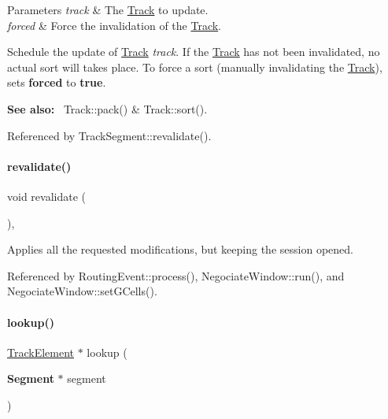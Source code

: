 \begin{DoxyParams}{Parameters}
{\em track} & The \mbox{\hyperlink{classKite_1_1Track}{Track}} to update. \\
\hline
{\em forced} & Force the invalidation of the {\ttfamily \mbox{\hyperlink{classKite_1_1Track}{Track}}}.\\
\hline
\end{DoxyParams}
Schedule the update of \mbox{\hyperlink{classKite_1_1Track}{Track}} {\itshape track}. If the {\ttfamily \mbox{\hyperlink{classKite_1_1Track}{Track}}} has not been invalidated, no actual sort will takes place. To force a sort (manually invalidating the {\ttfamily \mbox{\hyperlink{classKite_1_1Track}{Track}}}), sets {\bfseries forced} to {\bfseries true}.

{\bfseries See also\+:}~ Track\+::pack() \& Track\+::sort(). 

Referenced by Track\+Segment\+::revalidate().

\mbox{\label{classKite_1_1Session_a5bd93abe1416952ace15a98dbeeed124}} 
\paragraph{\texorpdfstring{revalidate()}{revalidate()}}
{\footnotesize\ttfamily void revalidate (\begin{DoxyParamCaption}{ }\end{DoxyParamCaption})\hspace{0.3cm}{\ttfamily [inline]}, {\ttfamily [static]}}

Applies all the requested modifications, but keeping the session opened. 

Referenced by Routing\+Event\+::process(), Negociate\+Window\+::run(), and Negociate\+Window\+::set\+G\+Cells().

\mbox{\label{classKite_1_1Session_a1728621b96081c32fb7bfb18a0ebfad3}} 
\paragraph{\texorpdfstring{lookup()}{lookup()}\hspace{0.1cm}{\footnotesize\ttfamily [1/2]}}
{\footnotesize\ttfamily \mbox{\hyperlink{classKite_1_1TrackElement}{Track\+Element}} $\ast$ lookup (\begin{DoxyParamCaption}\item[{\textbf{ Segment} $\ast$}]{segment }\end{DoxyParamCaption})\hspace{0.3cm}{\ttfamily [static]}}

